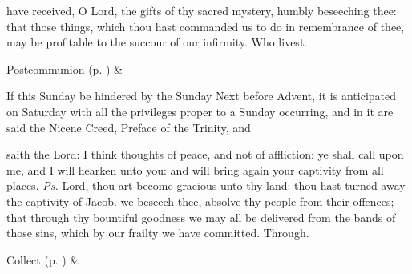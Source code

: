 
\postcommunion
{} have received, O Lord, the gifts of thy sacred mystery, humbly beseeching thee: that those things, which thou hast commanded us to do in remembrance of thee, may be profitable to the succour of our infirmity. Who livest.
\begin{rubric}
     Postcommunion  (p. \pageref{SPSaints}) \&  
\end{rubric}


\clearpage
{}
\begin{rubric}
If this Sunday be hindered by the Sunday Next before Advent, it is anticipated on Saturday with all the privileges proper to a Sunday occurring, and in it are said  the Nicene Creed, Preface of the Trinity, and 
\end{rubric}


\introit
{} saith the Lord: I think thoughts of peace, and not of affliction: ye shall call upon me, and I will hearken unto you: and will bring again your captivity from all places. \textit{Ps.} Lord, thou art become gracious unto thy land: thou hast turned away the captivity of Jacob.
\collect
{} we beseech thee, absolve thy people from their offences; that through thy bountiful goodness we may all be delivered from the bands of those sins, which by our frailty we have committed. Through.
\begin{rubric}
     Collect  (p. \pageref{SPSaints}) \&  
\end{rubric}

